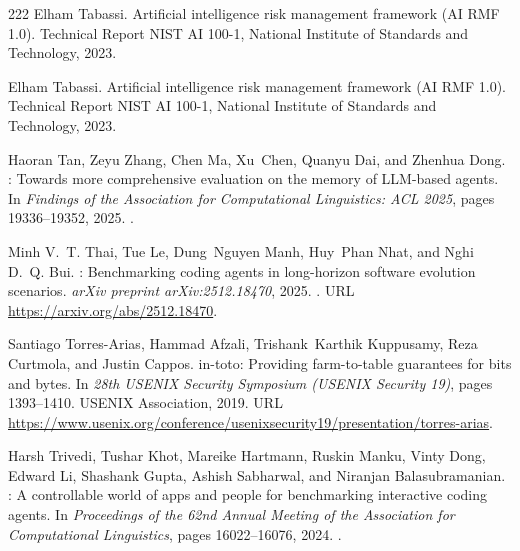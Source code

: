 \begin{thebibliography}{222}
Elham Tabassi.
\newblock Artificial intelligence risk management framework ({AI RMF 1.0}).
\newblock Technical Report NIST AI 100-1, National Institute of Standards and
  Technology, 2023{}.

Elham Tabassi.
\newblock Artificial intelligence risk management framework ({AI RMF} 1.0).
\newblock Technical Report NIST AI 100-1, National Institute of Standards and
  Technology, 2023{}.

Haoran Tan, Zeyu Zhang, Chen Ma, Xu~Chen, Quanyu Dai, and Zhenhua Dong.
: Towards more comprehensive evaluation on the memory of
  {LLM}-based agents.
\newblock In \emph{Findings of the Association for Computational Linguistics:
  ACL 2025}, pages 19336--19352, 2025.
\newblock {}.

Minh V.~T. Thai, Tue Le, Dung~Nguyen Manh, Huy~Phan Nhat, and Nghi D.~Q. Bui.
: Benchmarking coding agents in long-horizon software
  evolution scenarios.
\newblock \emph{arXiv preprint arXiv:2512.18470}, 2025.
\newblock {}.
\newblock URL \url{https://arxiv.org/abs/2512.18470}.

Santiago Torres-Arias, Hammad Afzali, Trishank~Karthik Kuppusamy, Reza
  Curtmola, and Justin Cappos.
\newblock in-toto: Providing farm-to-table guarantees for bits and bytes.
\newblock In \emph{28th USENIX Security Symposium (USENIX Security 19)}, pages
  1393--1410. USENIX Association, 2019.
\newblock URL
  \url{https://www.usenix.org/conference/usenixsecurity19/presentation/torres-arias}.

Harsh Trivedi, Tushar Khot, Mareike Hartmann, Ruskin Manku, Vinty Dong, Edward
  Li, Shashank Gupta, Ashish Sabharwal, and Niranjan Balasubramanian.
: A controllable world of apps and people for benchmarking
  interactive coding agents.
\newblock In \emph{Proceedings of the 62nd Annual Meeting of the Association
  for Computational Linguistics}, pages 16022--16076, 2024.
\newblock {}.


\end{thebibliography}
